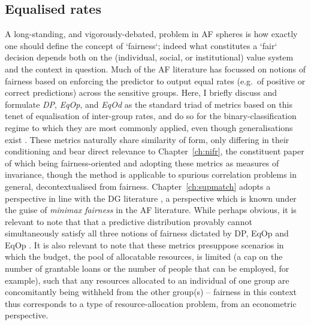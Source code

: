 \subsection{Equalised rates}\label{sec:equalised-rates}
%
A long-standing, and vigorously-debated, problem in \ac{AF} spheres is how exactly one should
define the concept of `fairness`; indeed what constitutes a `fair` decision depends both on the
(individual, social, or institutional) value system and the context in question.
%
Much of the \ac{AF} literature has focussed on notions of fairness based on enforcing the predictor
to output equal rates (e.g.\ of positive or correct predictions) across the sensitive groups.
%
Here, I briefly discuss and formulate \emph{\ac{DP}}, \emph{\ac{EqOp}}, and \emph{\ac{EqOd}} as
the standard triad of metrics based on this tenet of equalisation of inter-group rates, and do so
for the binary-classification regime to which they are most commonly applied, even though
generalisations exist \citep{woodworth2017learning}. 
%
These metrics naturally share similarity of form, only differing in their conditioning and bear
direct relevance to Chapter~\ref{ch:nifr}, the constituent paper of which being fairness-oriented
and adopting these metrics as measures of invariance, though the method is applicable to spurious
correlation problems in general, decontextualised from fairness.
%
Chapter~\ref{ch:supmatch} adopts a perspective in line with the \ac{DG} literature
\citep{sagawa2019distributionally}, a perspective which is known under the guise of \emph{minimax
fairness} in the \ac{AF} literature.
%
While perhaps obvious, it is relevant to note that that a predictive distribution provably cannot
simultaneously satisfy all three notions of fairness dictated by \ac{DP}, \ac{EqOp} and \ac{EqOp}
\citep{kleinberg2016inherent}.
%
It is also relevant to note that these metrics presuppose scenarios in which the budget, the pool
of allocatable resources, is limited (a cap on the number of grantable loans or the number of
people that can be employed, for example), such that any resources allocated to an individual of
one group are concomitantly being withheld from the other group(s) -- fairness in this context thus
corresponds to a type of resource-allocation problem, from an econometric perspective.
%

